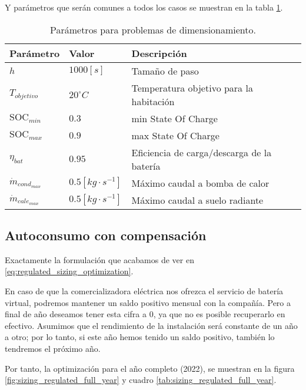 Y parámetros que serán comunes a todos los casos se muestran en la tabla
\ref{tab:sizing_optimization_data}.

\begin{table}[ht]
	\centering
	\caption{Parámetros para problemas de dimensionamiento.}
	\label{tab:sizing_optimization_data}
	\begin{tabular}{@{}lll@{}}
		\toprule
		\textbf{Parámetro}     & \textbf{Valor}         & \textbf{Descripción}                       \\
		\midrule
		$h$                    & $1000[s]$              & Tamaño de paso                             \\
		$T_{objetivo}$         & $20 ^\circ C$          & Temperatura objetivo para la habitación    \\
		$\text{SOC}_{min}$     & $0.3$                  & min State Of Charge                        \\
		$\text{SOC}_{max}$     & $0.9$                  & max State Of Charge                        \\
		$\eta_{bat}$           & $0.95$                 & Eficiencia de carga/descarga de la batería \\
		$\dot{m}_{cond_{max}}$ & $0.5[kg \cdot s^{-1}]$ & Máximo caudal a bomba de calor             \\
		$\dot{m}_{cale_{max}}$ & $0.5[kg \cdot s^{-1}]$ & Máximo caudal a suelo radiante             \\
		\bottomrule
	\end{tabular}
\end{table}


\clearpage
\subsection{Autoconsumo con compensación}

Exactamente la formulación que acabamos de ver en
\eqref{eq:regulated_sizing_optimization}.

En caso de que la comercializadora eléctrica nos ofrezca el servicio de batería
virtual, podremos mantener un saldo positivo mensual con la compañía. Pero a
final de año deseamos tener esta cifra a 0, ya que no es posible recuperarlo en
efectivo. Asumimos que el rendimiento de la instalación será constante de un
año a otro; por lo tanto, si este año hemos tenido un saldo positivo, también
lo tendremos el próximo año.

Por tanto, la optimización para el año completo (2022), se muestran en la
figura \ref{fig:sizing_regulated_full_year} y cuadro \ref{tab:sizing_regulated_full_year}.

